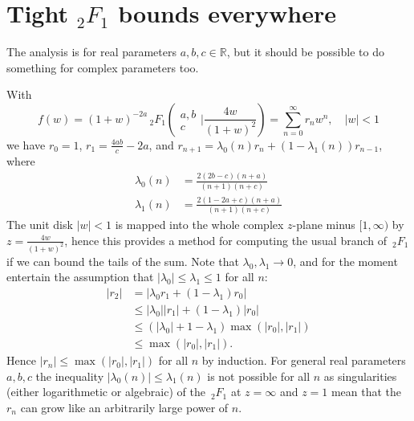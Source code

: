 \documentclass[12pt]{article}
\numberwithin{equation}{section}
\begin{document}
\section{Tight ${}_2 F_1$ bounds everywhere}
The analysis is for real parameters $a,b,c \in \mathbb{R}$, but it should be possible to do something for complex parameters too.

With
\begin{equation}
f(w) = (1+w)^{-2 a} \, _2F_1\left(\begin{array}{c} a,b \\ c \end{array} \Big| \frac{4 w}{(1+w)^2}\right) = \sum_{n=0}^{\infty}r_n w^n, \quad |w| < 1
\end{equation}
we have $r_0=1$, $r_1=\frac{4ab}{c} - 2a$, and $r_{n+1} = \lambda_0(n) r_n + (1-\lambda_1(n)) r_{n-1}$, where
\begin{align*}
\lambda_0(n) &= \frac{2 (2 b-c) (n+a)}{(n+1) (n+c)}\\
\lambda_1(n) &= \frac{2 (1-2 a+c) (n+a)}{(n+1) (n+c)}
\end{align*}
The unit disk $|w| < 1$ is mapped into the whole complex $z$-plane minus $[1,\infty)$ by $z=\frac{4w}{(1+w)^2}$, hence this provides a method for computing the usual branch of $\, _2F_1$ if we can bound the tails of the sum. Note that $\lambda_0, \lambda_1 \to 0$, and for the moment entertain the assumption that $|\lambda_0| \le \lambda_1 \le 1$ for all $n$:
\begin{align*}
|r_2| &= |\lambda_0 r_1 + (1 - \lambda_1) r_0| \\
& \le |\lambda_0||r_1| + (1 - \lambda_1) |r_0| \\
& \le  (|\lambda_0| + 1 - \lambda_1) \operatorname{max}(|r_0|, |r_1|) \\
& \le \operatorname{max}(|r_0|, |r_1|)\text{.}
\end{align*}
Hence $|r_n| \le \operatorname{max}(|r_0|, |r_1|)$ for all $n$ by induction. For general real parameters $a, b, c$ the inequality $|\lambda_0(n)| \le \lambda_1(n)$ is not possible for all $n$ as singularities (either logarithmetic or algebraic) of the $\, _2F_1$ at $z=\infty$ and $z=1$ mean that the $r_n$ can grow like an arbitrarily large power of $n$.
\end{document}
